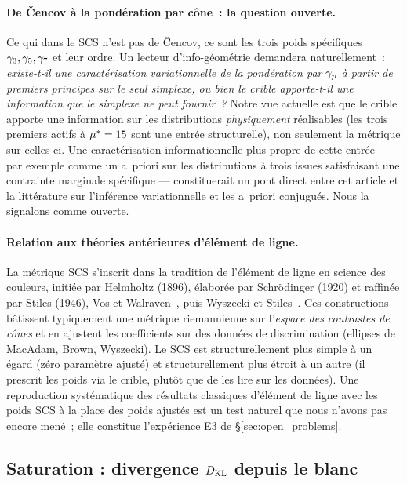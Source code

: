 \documentclass[12pt,a4paper]{article}
\begin{document}
\paragraph{De \v{C}encov \`a la pond\'eration par c\^one~: la question ouverte.}
Ce qui dans le SCS n'est pas de \v{C}encov, ce sont les trois poids
sp\'ecifiques $\gamma_{3}, \gamma_{5}, \gamma_{7}$ et leur ordre. Un
lecteur d'info-g\'eom\'etrie demandera naturellement~: \emph{existe-t-il
une caract\'erisation variationnelle de la pond\'eration par
$\gamma_{p}$ \`a partir de premiers principes sur le seul simplexe, ou
bien le crible apporte-t-il une information que le simplexe ne peut
fournir~?} Notre vue actuelle est que le crible apporte une
information sur les distributions \emph{physiquement} r\'ealisables
(les trois premiers actifs \`a ${\mu^{*}} = 15$ sont une entr\'ee
structurelle), non seulement la m\'etrique sur celles-ci. Une
caract\'erisation informationnelle plus propre de cette entr\'ee
--- par exemple comme un a~priori sur les distributions \`a trois
issues satisfaisant une contrainte marginale sp\'ecifique ---
constituerait un pont direct entre cet article et la litt\'erature
sur l'inf\'erence variationnelle et les a~priori conjugu\'es. Nous la
signalons comme ouverte.

\paragraph{Relation aux th\'eories ant\'erieures d'\'el\'ement de ligne.}
La m\'etrique SCS s'inscrit dans la tradition de l'\'el\'ement de
ligne en science des couleurs, initi\'ee par Helmholtz (1896),
\'elabor\'ee par Schr\"odinger (1920) et raffin\'ee par Stiles (1946),
Vos et Walraven~\cite{voswalraven1972}, puis Wyszecki et
Stiles~\cite{wyszecki2000}. Ces constructions b\^atissent
typiquement une m\'etrique riemannienne sur l'\emph{espace des
contrastes de c\^ones} et en ajustent les coefficients sur des
donn\'ees de discrimination (ellipses de MacAdam, Brown, Wyszecki).
Le SCS est structurellement plus simple \`a un \'egard (z\'ero
param\`etre ajust\'e) et structurellement plus \'etroit \`a un
autre (il prescrit les poids via le crible, plut\^ot que de les lire
sur les donn\'ees). Une reproduction syst\'ematique des r\'esultats
classiques d'\'el\'ement de ligne avec les poids SCS \`a la place
des poids ajust\'es est un test naturel que nous n'avons pas encore
men\'e~; elle constitue l'exp\'erience E3 de
\S\ref{sec:open_problems}.

\subsection{Saturation : divergence $D_{\mathrm{KL}}$ depuis le blanc}
\end{document}
